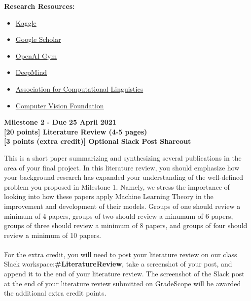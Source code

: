 \textbf{Research Resources: }
\begin{itemize}
    \item \href{https://www.kaggle.com/datasets}{Kaggle}
    \item \href{https://scholar.google.com/}{Google Scholar}
    \item \href{https://gym.openai.com/}{OpenAI Gym}
    \item \href{https://deepmind.com/}{DeepMind}
    \item \href{https://www.mitpressjournals.org/loi/coli}{Association for Computational Linguistics}
    \item \href{https://openaccess.thecvf.com/menu}{Computer Vision Foundation}
\end{itemize}

\clearpage

\large
\textbf{Milestone 2 - Due 25 April 2021}\\

\textbf{[20 points] Literature Review (4-5 pages)}\\
\textbf{[3 points (extra credit)] Optional Slack Post Shareout}


\normalsize
This is a short paper summarizing and synthesizing several publications in the area of your final project. In this literature review, you should emphasize how your background research has expanded your understanding of the well-defined problem you proposed in Milestone 1. Namely, we stress the importance of looking into how these papers apply Machine Learning Theory in the improvement and development of their models. Groups of one should review a minimum of 4 papers, groups of two should review a minumum of 6 papers, groups of three should review a minimum of 8 papers, and groups of four should review a minimum of 10 papers.\\~\\
For the extra credit, you will need to post your literature review on our class Slack workspace:\textbf{\#LiteratureReview}, take a screenshot of your post, and append it to the end of your literature review. The screenshot of the Slack post at the end of your literature review submitted on GradeScope will be awarded the additional extra credit points.\\

